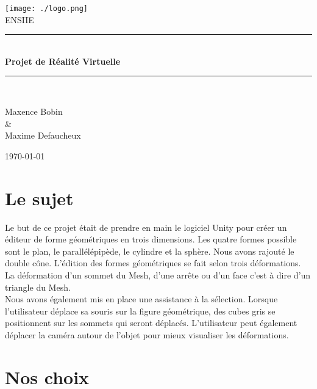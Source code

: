 \documentclass[a4paper,oneside,12pt,titlepage]{article}
\newcommand{\HRule}{\rule{\linewidth}{0.5mm}}
\begin{document}
\begin{titlepage}
\begin{center}
 
\texttt{[image: ./logo.png]}\\[1cm]
 
\textsc{\Large ENSIIE}\\[0.5cm]
 
 
\HRule \\[0.4cm]
{ \huge \bfseries
Projet de Réalité Virtuelle}\\[0.4cm]
 
\HRule \\[1.5cm]
 
\begin{center}
\large Maxence Bobin \\
\& \\
\large Maxime Defaucheux
\end{center}
 
\vfill
{\large \today}
 
\end{center}
\end{titlepage}

\clearpage
\tableofcontents
\clearpage

\section{Le sujet}

Le but de ce projet était de prendre en main le logiciel Unity pour créer un éditeur de forme géométriques en trois dimensions. Les quatre formes possible sont le plan, le parallélépipède, le cylindre et la sphère. Nous avons rajouté le double cône.
L'édition des formes géométriques se fait selon trois déformations. La déformation d'un sommet du Mesh, d'une arrête ou d'un face c'est à dire d'un triangle du Mesh.
\\Nous avons également mis en place une assistance à la sélection. Lorsque l'utilisateur déplace sa souris sur la figure géométrique, des cubes gris se positionnent sur les sommets qui seront déplacés. L'utilisateur peut également déplacer la caméra autour de l'objet pour mieux visualiser les déformations.



\section{Nos choix}
\end{document}
